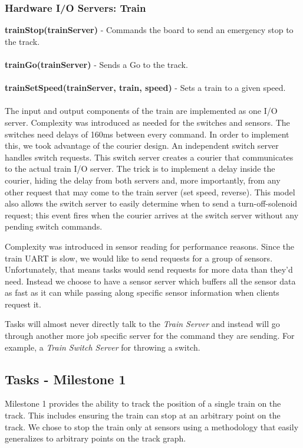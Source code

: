 \documentclass[twoside,a4paper]{refart}
\begin{document}
\subsubsection{Hardware I/O Servers: Train}

\textbf{trainStop(trainServer)} - Commands the board to send an emergency stop to the track.\\\\
\textbf{trainGo(trainServer)} - Sends a Go to the track.\\\\
\textbf{trainSetSpeed(trainServer, train, speed)} - Sets a train to a given speed.\\\\

The input and output components of the train are implemented as one I/O server. Complexity was introduced as needed for the switches and sensors. The switches need delays of 160ms between every command. In order to implement this, we took advantage of the courier design. An independent switch server handles switch requests. This switch server creates a courier that communicates to the actual train I/O server. The trick is to implement a delay inside the courier, hiding the delay from both servers and, more importantly, from any other request that may come to the train server (set speed, reverse). This model also allows the switch server to easily determine when to send a turn-off-solenoid request; this event fires when the courier arrives at the switch server without any pending switch commands.

Complexity was introduced in sensor reading for performance reasons. Since the train UART is slow, we would like to send requests for a group of sensors. Unfortunately, that means tasks would send requests for more data than they’d need. Instead we choose to have a sensor server which buffers all the sensor data as fast as it can while passing along specific sensor information when clients request it.

Tasks will almost never directly talk to the \textit{Train Server} and instead will go through another more job specific server for the command they are sending. For example, a \textit{Train Switch Server} for throwing a switch.

\subsection{Tasks - Milestone 1}
Milestone 1 provides the ability to track the position of a single train on the track. This includes ensuring the train can stop at an arbitrary point on the track. We chose to stop the train only at sensors using a methodology that easily generalizes to arbitrary points on the track graph.
\end{document}
